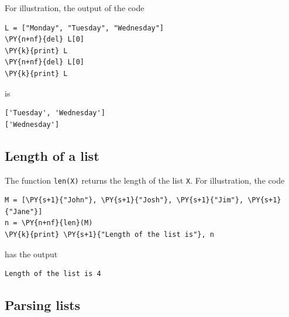 \noindent
For illustration, the output of the code \\

\begin{bbox}
\begin{Verbatim}[commandchars=\\\{\}]
L = ["Monday", "Tuesday", "Wednesday"]
\PY{n+nf}{del} L[0]
\PY{k}{print} L
\PY{n+nf}{del} L[0]
\PY{k}{print} L
\end{Verbatim}
\end{bbox}
\vspace{6mm}

\noindent
is \\

\begin{ybox}
\begin{Verbatim}[commandchars=\\\{\}]
['Tuesday', 'Wednesday']
['Wednesday']
\end{Verbatim}
\end{ybox}
\vspace{6mm}

\subsection[\ \ Length of a list]{Length of a list}

\noindent
The function {\tt len(X)} returns the length of the list {\tt X}.
For illustration, the code \\

\begin{bbox}
\begin{Verbatim}[commandchars=\\\{\}]
M = [\PY{s+1}{"John"}, \PY{s+1}{"Josh"}, \PY{s+1}{"Jim"}, \PY{s+1}{"Jane"}]
n = \PY{n+nf}{len}(M)
\PY{k}{print} \PY{s+1}{"Length of the list is"}, n
\end{Verbatim}
\end{bbox}
\vspace{6mm}

\noindent
has the output\\

\begin{ybox}
\begin{Verbatim}[commandchars=\\\{\}]
Length of the list is 4
\end{Verbatim}
\end{ybox}
\vspace{6mm}

\subsection[\ \ Parsing lists]{Parsing lists}

